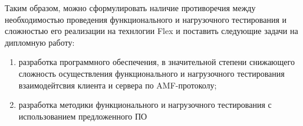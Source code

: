 Таким образом, можно сформулировать наличие противоречия между необходимостью проведения функционального
и нагрузочного тестирования и сложностью его реализации на технлогии Flex и поставить следующие задачи на 
дипломную работу:

\begin{enumerate}
\item разработка программного обеспечения, в значительной степени снижающего сложность осуществления функционального
и нагрузочного тестирования взаимодейтсвия клиента и сервера по AMF-протоколу;
\item разработка методики функционального и нагрузочного тестирования с использованием предложенного ПО
\end{enumerate}